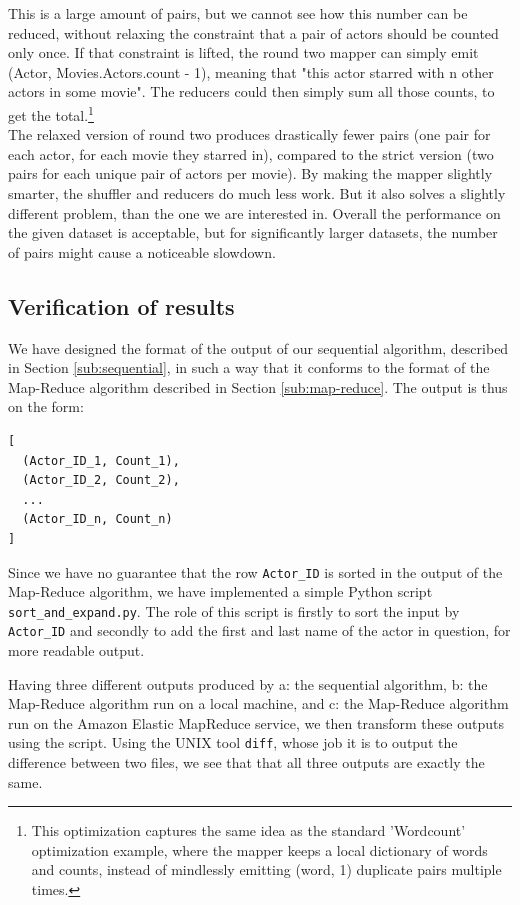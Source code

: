 \documentclass[a4paper,11pt]{article}
\begin{document}
This is a large amount of pairs, but we cannot see how this number can be reduced, without relaxing the constraint that a pair of actors should be counted only once. If that constraint is lifted, the round two mapper can simply emit (Actor, Movies.Actors.count - 1), meaning that "this actor starred with n other actors in some movie". The reducers could then simply sum all those counts, to get the total.\footnote{This optimization captures the same idea as the standard 'Wordcount' optimization example, where the mapper keeps a local dictionary of words and counts, instead of mindlessly emitting (word, 1) duplicate pairs multiple times.}\\
The relaxed version of round two produces drastically fewer pairs (one pair for each actor, for each movie they starred in), compared to the strict version (two pairs for each unique pair of actors per movie). By making the mapper slightly smarter, the shuffler and reducers do much less work. But it also solves a slightly different problem, than the one we are interested in. Overall the performance on the given dataset is acceptable, but for significantly larger datasets, the number of pairs might cause a noticeable slowdown.

\subsection{Verification of results}
We have designed the format of the output of our sequential algorithm, described in Section \ref{sub:sequential}, in such a way that it conforms to the format of the Map-Reduce algorithm described in Section \ref{sub:map-reduce}. 
The output is thus on the form:
\begin{verbatim}
[ 
  (Actor_ID_1, Count_1),
  (Actor_ID_2, Count_2),
  ...
  (Actor_ID_n, Count_n)
]
\end{verbatim}
Since we have no guarantee that the row \texttt{Actor\_ID} is sorted in the output of the Map-Reduce algorithm, we have implemented a simple Python script \texttt{sort\_and\_expand.py}. 
The role of this script is firstly to sort the input by \texttt{Actor\_ID} and secondly to add the first and last name of the actor in question, for more readable output.

Having three different outputs produced by a: the sequential algorithm, b: the Map-Reduce algorithm run on a local machine, and c: the Map-Reduce algorithm run on the Amazon Elastic MapReduce service, we then transform these outputs using the script.
Using the UNIX tool \texttt{diff}, whose job it is to output the difference between two files, we see that that all three outputs are exactly the same.
\end{document}
